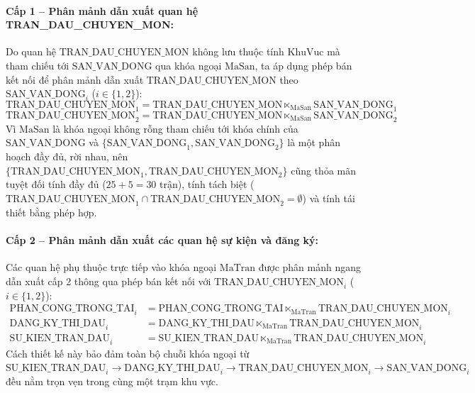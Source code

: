 \paragraph{Cấp 1 -- Phân mảnh dẫn xuất quan hệ TRAN\_DAU\_CHUYEN\_MON:}
Do quan hệ $\text{TRAN\_DAU\_CHUYEN\_MON}$ không lưu thuộc tính $\text{KhuVuc}$ mà tham chiếu tới $\text{SAN\_VAN\_DONG}$ qua khóa ngoại $\text{MaSan}$, ta áp dụng phép bán kết nối để phân mảnh dẫn xuất $\text{TRAN\_DAU\_CHUYEN\_MON}$ theo $\text{SAN\_VAN\_DONG}_i$ ($i \in \{1, 2\}$):
$$\text{TRAN\_DAU\_CHUYEN\_MON}_1 = \text{TRAN\_DAU\_CHUYEN\_MON} \ltimes_{\text{MaSan}} \text{SAN\_VAN\_DONG}_1$$
$$\text{TRAN\_DAU\_CHUYEN\_MON}_2 = \text{TRAN\_DAU\_CHUYEN\_MON} \ltimes_{\text{MaSan}} \text{SAN\_VAN\_DONG}_2$$
Vì $\text{MaSan}$ là khóa ngoại không rỗng tham chiếu tới khóa chính của $\text{SAN\_VAN\_DONG}$ và $\{\text{SAN\_VAN\_DONG}_1, \text{SAN\_VAN\_DONG}_2\}$ là một phân hoạch đầy đủ, rời nhau, nên $\{\text{TRAN\_DAU\_CHUYEN\_MON}_1, \text{TRAN\_DAU\_CHUYEN\_MON}_2\}$ cũng thỏa mãn tuyệt đối tính đầy đủ ($25 + 5 = 30$ trận), tính tách biệt ($\text{TRAN\_DAU\_CHUYEN\_MON}_1 \cap \text{TRAN\_DAU\_CHUYEN\_MON}_2 = \emptyset$) và tính tái thiết bằng phép hợp.

\paragraph{Cấp 2 -- Phân mảnh dẫn xuất các quan hệ sự kiện và đăng ký:}
Các quan hệ phụ thuộc trực tiếp vào khóa ngoại $\text{MaTran}$ được phân mảnh ngang dẫn xuất cấp 2 thông qua phép bán kết nối với $\text{TRAN\_DAU\_CHUYEN\_MON}_i$ ($i \in \{1, 2\}$):
\begin{align*}
    \text{PHAN\_CONG\_TRONG\_TAI}_i &= \text{PHAN\_CONG\_TRONG\_TAI} \ltimes_{\text{MaTran}} \text{TRAN\_DAU\_CHUYEN\_MON}_i \\
    \text{DANG\_KY\_THI\_DAU}_i &= \text{DANG\_KY\_THI\_DAU} \ltimes_{\text{MaTran}} \text{TRAN\_DAU\_CHUYEN\_MON}_i \\
    \text{SU\_KIEN\_TRAN\_DAU}_i &= \text{SU\_KIEN\_TRAN\_DAU} \ltimes_{\text{MaTran}} \text{TRAN\_DAU\_CHUYEN\_MON}_i
\end{align*}
Cách thiết kế này bảo đảm toàn bộ chuỗi khóa ngoại từ $\text{SU\_KIEN\_TRAN\_DAU}_i \rightarrow \text{DANG\_KY\_THI\_DAU}_i \rightarrow \text{TRAN\_DAU\_CHUYEN\_MON}_i \rightarrow \text{SAN\_VAN\_DONG}_i$ đều nằm trọn vẹn trong cùng một trạm khu vực.

